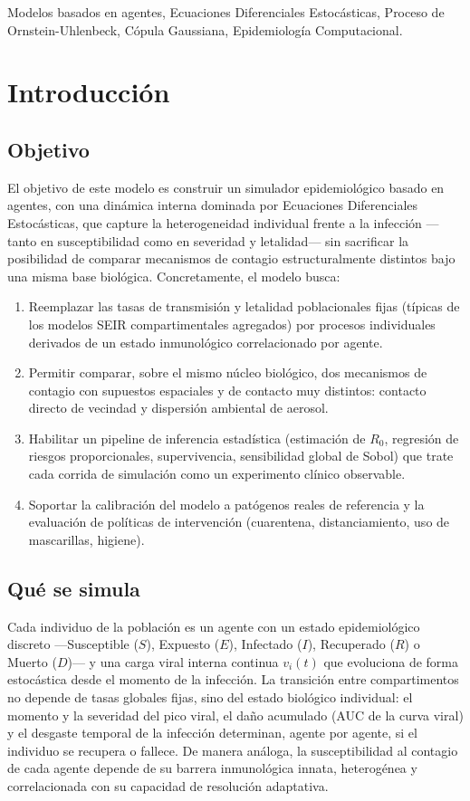 \documentclass[conference]{IEEEtran}
\begin{document}
\begin{IEEEkeywords}
Modelos basados en agentes, Ecuaciones Diferenciales Estocásticas, Proceso de Ornstein-Uhlenbeck, Cópula Gaussiana, Epidemiología Computacional.
\end{IEEEkeywords}

\section{Introducción}
\subsection{Objetivo}
El objetivo de este modelo es construir un simulador epidemiológico basado en agentes, con una dinámica interna dominada por Ecuaciones Diferenciales Estocásticas, que capture la heterogeneidad individual frente a la infección ---tanto en susceptibilidad como en severidad y letalidad--- sin sacrificar la posibilidad de comparar mecanismos de contagio estructuralmente distintos bajo una misma base biológica. Concretamente, el modelo busca:
\begin{enumerate}
    \item Reemplazar las tasas de transmisión y letalidad poblacionales fijas (típicas de los modelos SEIR compartimentales agregados) por procesos individuales derivados de un estado inmunológico correlacionado por agente.
    \item Permitir comparar, sobre el mismo núcleo biológico, dos mecanismos de contagio con supuestos espaciales y de contacto muy distintos: contacto directo de vecindad y dispersión ambiental de aerosol.
    \item Habilitar un pipeline de inferencia estadística (estimación de $R_0$, regresión de riesgos proporcionales, supervivencia, sensibilidad global de Sobol) que trate cada corrida de simulación como un experimento clínico observable.
    \item Soportar la calibración del modelo a patógenos reales de referencia y la evaluación de políticas de intervención (cuarentena, distanciamiento, uso de mascarillas, higiene).
\end{enumerate}

\subsection{Qué se simula}
Cada individuo de la población es un agente con un estado epidemiológico discreto ---Susceptible ($S$), Expuesto ($E$), Infectado ($I$), Recuperado ($R$) o Muerto ($D$)--- y una carga viral interna continua $v_i(t)$ que evoluciona de forma estocástica desde el momento de la infección. La transición entre compartimentos no depende de tasas globales fijas, sino del estado biológico individual: el momento y la severidad del pico viral, el daño acumulado (AUC de la curva viral) y el desgaste temporal de la infección determinan, agente por agente, si el individuo se recupera o fallece. De manera análoga, la susceptibilidad al contagio de cada agente depende de su barrera inmunológica innata, heterogénea y correlacionada con su capacidad de resolución adaptativa.
\end{document}
